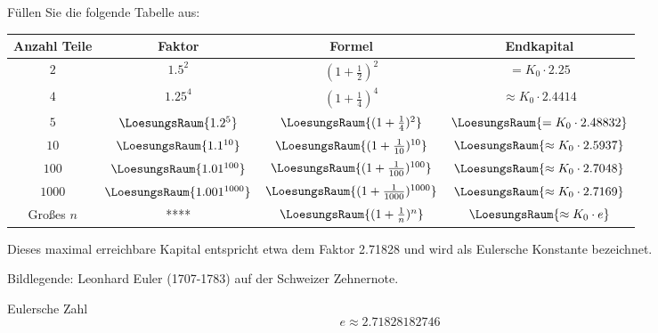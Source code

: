 Füllen Sie die folgende Tabelle aus:

\begin{tabular}{c|c|c|c} 
  Anzahl Teile  & Faktor                      & Formel          & Endkapital \\ \hline
  $2$           & $1.5^2$                      & $(1+\frac12)^2$ & $= K_0 \cdot{} 2.25 $ \\ \hline
  $4$           & $1.25^4$                  & $(1+\frac14)^4$ & $\approx K_0 \cdot{} 2.4414 $ \\ \hline
  $5$           & $\LoesungsRaum{1.2^5}$  & $\LoesungsRaum{(1+\frac14)^2}$ & $\LoesungsRaum{= K_0 \cdot{} 2.48832} $ \\ \hline
  $10$           & $\LoesungsRaum{1.1^{10}}$  & $\LoesungsRaum{(1+\frac{1}{10})^{10}}$ & $\LoesungsRaum{\approx K_0 \cdot{} 2.5937} $ \\ \hline
  $100$           & $\LoesungsRaum{1.01^{100}}$  & $\LoesungsRaum{(1+\frac{1}{100})^{100}}$ & $\LoesungsRaum{\approx K_0 \cdot{} 2.7048 }$ \\ \hline
  $1000$           & $\LoesungsRaum{1.001^{1000}}$  & $\LoesungsRaum{(1+\frac{1}{1000})^{1000}}$ & $\LoesungsRaum{\approx K_0 \cdot{} 2.7169 }$ \\ \hline
  Großes $n$           & ****  & $\LoesungsRaum{(1+\frac{1}{n})^{n}}$ & $\LoesungsRaum{\approx K_0 \cdot{} e }$ \\ \hline
\end{tabular} 

Dieses maximal erreichbare Kapital entspricht etwa dem Faktor 2.71828 und
wird als Eulersche Konstante bezeichnet.

Bildlegende: Leonhard Euler (1707-1783) auf der Schweizer Zehnernote.

\begin{definition}{Eulersche Zahl}{}
$$e \approx 2.71828182746$$
\end{definition}
\newpage



